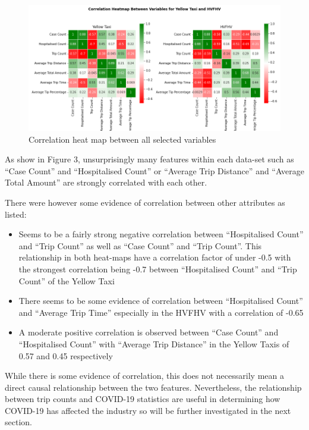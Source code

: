 \documentclass[11pt]{article}
\begin{document}
\begin{figure}[H]
    \centering
    \includegraphics[scale=0.5]{plots/agg_correlation_heatmap.png}
    \caption{Correlation heat map between all selected variables}
\end{figure}

As show in Figure 3, unsurprisingly many features within each data-set such as ``Case Count'' and ``Hospitalised Count'' or ``Average Trip Distance'' and ``Average Total Amount'' are strongly correlated with each other. 

There were however some evidence of correlation between other attributes as listed:
\begin{itemize}
    \item Seems to be a fairly strong negative correlation between ``Hospitalised Count'' and ``Trip Count'' as well as ``Case Count'' and ``Trip Count''. This relationship in both heat-maps have a correlation factor of under -0.5 with the strongest correlation being -0.7 between ``Hospitalised Count'' and ``Trip Count'' of the Yellow Taxi
    \item There seems to be some evidence of correlation between ``Hospitalised Count'' and ``Average Trip Time'' especially in the HVFHV with a correlation of -0.65
    \item A moderate positive correlation is observed between ``Case Count'' and ``Hospitalised Count'' with ``Average Trip Distance'' in the Yellow Taxis of 0.57 and 0.45 respectively
\end{itemize}

While there is some evidence of correlation, this does not necessarily mean a direct causal relationship between the two features. Nevertheless, the relationship between trip counts and COVID-19 statistics are useful in determining how COVID-19 has affected the industry so will be further investigated in the next section.
\end{document}
